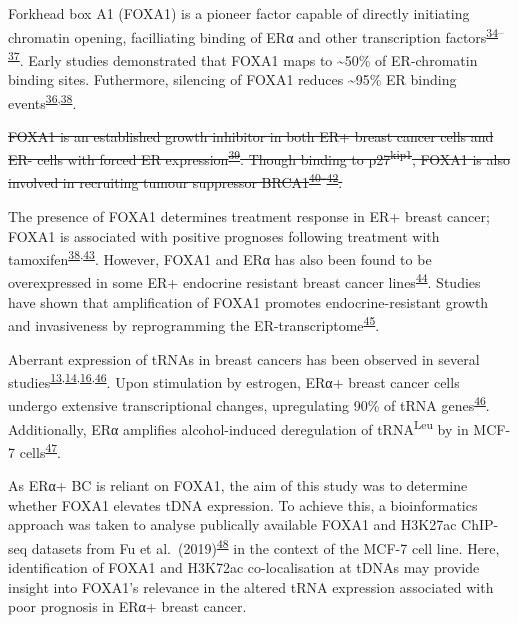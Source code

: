 \documentclass[
  11pt,
]{article}
\begin{document}
Forkhead box A1 (FOXA1) is a pioneer factor capable of directly initiating chromatin opening, facilliating binding of ERα and other transcription factors\textsuperscript{\protect\hyperlink{ref-Costa1989}{34}--\protect\hyperlink{ref-laganiuxe8re2005}{37}}.
Early studies demonstrated that FOXA1 maps to \textasciitilde50\% of ER-chromatin binding sites.
Futhermore, silencing of FOXA1 reduces \textasciitilde95\% ER binding events\textsuperscript{\protect\hyperlink{ref-carroll2005}{36},\protect\hyperlink{ref-Hurtado2011}{38}}.

\sout{FOXA1 is an established growth inhibitor in both ER+ breast cancer cells and ER- cells with forced ER expression\textsuperscript{\protect\hyperlink{ref-Wolf2007}{39}}. Though binding to p27\textsuperscript{kip1}, FOXA1 is also involved in recruiting tumour suppressor BRCA1\textsuperscript{\protect\hyperlink{ref-Williamson2006}{40}--\protect\hyperlink{ref-Fredersdorf1997}{42}}.}

The presence of FOXA1 determines treatment response in ER+ breast cancer; FOXA1 is associated with positive prognoses following treatment with tamoxifen\textsuperscript{\protect\hyperlink{ref-Hurtado2011}{38},\protect\hyperlink{ref-Badve2007}{43}}.
However, FOXA1 and ERα has also been found to be overexpressed in some ER+ endocrine resistant breast cancer lines\textsuperscript{\protect\hyperlink{ref-ross-innes2012}{44}}.
Studies have shown that amplification of FOXA1 promotes endocrine-resistant growth and invasiveness by reprogramming the ER-transcriptome\textsuperscript{\protect\hyperlink{ref-Fu2016}{45}}.

Aberrant expression of tRNAs in breast cancers has been observed in several studies\textsuperscript{\protect\hyperlink{ref-Zhang2018}{13},\protect\hyperlink{ref-Pavon-Eternod2009}{14},\protect\hyperlink{ref-Krishnan2016}{16},\protect\hyperlink{ref-Hah2011}{46}}.
Upon stimulation by estrogen, ERα+ breast cancer cells undergo extensive transcriptional changes, upregulating 90\% of tRNA genes\textsuperscript{\protect\hyperlink{ref-Hah2011}{46}}.
Additionally, ERα amplifies alcohol-induced deregulation of tRNA\textsuperscript{Leu} by in MCF-7 cells\textsuperscript{\protect\hyperlink{ref-zhong2014}{47}}.

As ERα+ BC is reliant on FOXA1, the aim of this study was to determine whether FOXA1 elevates tDNA expression.
To achieve this, a bioinformatics approach was taken to analyse publically available FOXA1 and H3K27ac ChIP-seq datasets from Fu et al.~(2019)\textsuperscript{\protect\hyperlink{ref-fu2019}{48}} in the context of the MCF-7 cell line.
Here, identification of FOXA1 and H3K72ac co-localisation at tDNAs may provide insight into FOXA1's relevance in the altered tRNA expression associated with poor prognosis in ERα+ breast cancer.
\end{document}
